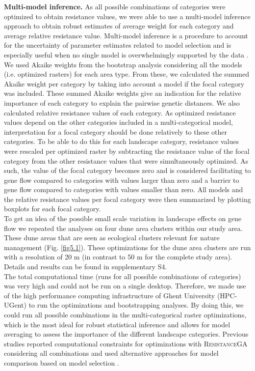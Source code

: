 \documentclass[10pt, twoside]{book} %
\begin{document}
		\noindent \textbf{Multi-model inference.} As all possible combinations of categories were optimized to obtain resistance values, we were able to use a multi-model inference approach to obtain robust estimates of average weight for each category and average relative resistance value. Multi-model inference is a procedure to account for the uncertainty of parameter estimates related to model selection and is especially useful when no single model is overwhelmingly supported by the data \citep{johnson2004}. We used Akaike weights from the bootstrap analysis considering all the models (i.e. optimized rasters) for each area type. From these, we calculated the summed Akaike weight per category by taking into account a model if the focal category was included. These summed Akaike weights give an indication for the relative importance of each category to explain the pairwise genetic distances. We also calculated relative resistance values of each category. As optimized resistance values depend on the other categories included in a multi-categorical model, interpretation for a focal category should be done relatively to these other categories. To be able to do this for each landscape category, resistance values were rescaled per optimized raster by subtracting the resistance value of the focal category from the other resistance values that were simultaneously optimized. As such, the value of the focal category becomes zero and is considered facilitating to gene flow compared to categories with values larger than zero and a barrier to gene flow compared to categories with values smaller than zero. All models and the relative resistance values per focal category were then summarized by plotting boxplots for each focal category.\\
		
		To get an idea of the possible small scale variation in landscape effects on gene flow we repeated the analyses on four dune area clusters within our study area. These dune areas that are seen as ecological clusters relevant for nature management (Fig. \ref{fig5.1}). These optimizations for the dune area clusters are run with a resolution of 20 m (in contrast to 50 m for the complete study area). Details and results can be found in supplementary S4.\\
		
		The total computational time (runs for all possible combinations of categories) was very high and could not be run on a single desktop. Therefore, we made use of the high performance computing infrastructure of Ghent University (HPC-UGent) to run the optimizations and bootstrapping analyses. By doing this, we could run all possible combinations in the multi-categorical raster optimizations, which is the most ideal for robust statistical inference and allows for model averaging to assess the importance of the different landscape categories. Previous studies reported computational constraints for optimizations with \textsc{ResistanceGA} considering all combinations and used alternative approaches for model comparison based on model selection \citep[e.g.][]{lourenco2019, kimmig2020}.\\
		
\end{document}
